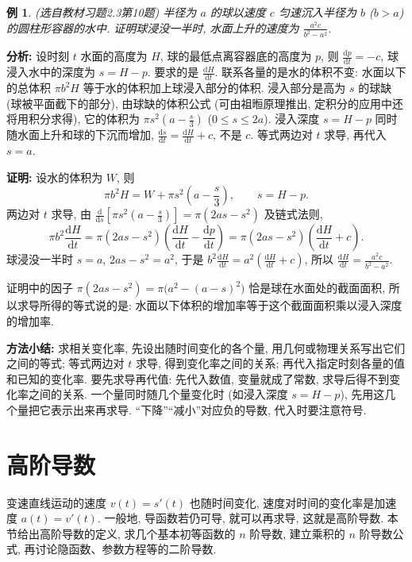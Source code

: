 \documentclass[UTF8,openany]{ctexbook}
\theoremstyle{chinesetextbook}
\newtheorem{example}{例}[section]
\newenvironment{cnproof}{\par\indent\textbf{证明:} \ignorespaces}{\par}
\newcommand{\dd}{\mathrm d}
\begin{document}
\begin{example}\label{ex:c2-h3-10}
\textnormal{(选自教材习题2.3第10题)} 半径为 $a$ 的球以速度 $c$ 匀速沉入半径为 $b$ ($b>a$) 的圆柱形容器的水中. 证明球浸没一半时, 水面上升的速度为 $\displaystyle\frac{a^2c}{b^2-a^2}$.
\end{example}
\par\indent\textbf{分析:} 设时刻 $t$ 水面的高度为 $H$, 球的最低点离容器底的高度为 $p$, 则 $\displaystyle\frac{\dd p}{\dd t}=-c$, 球浸入水中的深度为 $s=H-p$. 要求的是 $\displaystyle\frac{\dd H}{\dd t}$. 联系各量的是水的体积不变: 水面以下的总体积 $\pi b^2H$ 等于水的体积加上球浸入部分的体积. 浸入部分是高为 $s$ 的球缺 (球被平面截下的部分), 由球缺的体积公式 (可由祖暅原理推出, 定积分的应用中还将用积分求得), 它的体积为 $\displaystyle\pi s^2\left(a-\frac s3\right)$ ($0\le s\le2a$). 浸入深度 $s=H-p$ 同时随水面上升和球的下沉而增加, $\displaystyle\frac{\dd s}{\dd t}=\frac{\dd H}{\dd t}+c$, 不是 $c$. 等式两边对 $t$ 求导, 再代入 $s=a$.
\begin{cnproof}
设水的体积为 $W$, 则
\[
\pi b^2H=W+\pi s^2\left(a-\frac s3\right),\qquad s=H-p.
\]
两边对 $t$ 求导, 由 $\displaystyle\frac{\dd}{\dd s}\left[\pi s^2\left(a-\frac s3\right)\right]=\pi(2as-s^2)$ 及链式法则,
\[
\pi b^2\frac{\dd H}{\dd t}=\pi(2as-s^2)\left(\frac{\dd H}{\dd t}-\frac{\dd p}{\dd t}\right)=\pi(2as-s^2)\left(\frac{\dd H}{\dd t}+c\right).
\]
球浸没一半时 $s=a$, $2as-s^2=a^2$, 于是 $\displaystyle b^2\frac{\dd H}{\dd t}=a^2\left(\frac{\dd H}{\dd t}+c\right)$, 所以 $\displaystyle\frac{\dd H}{\dd t}=\frac{a^2c}{b^2-a^2}$.
\end{cnproof}
证明中的因子 $\pi(2as-s^2)=\pi\bigl(a^2-(a-s)^2\bigr)$ 恰是球在水面处的截面面积, 所以求导所得的等式说的是: 水面以下体积的增加率等于这个截面面积乘以浸入深度的增加率.
\par\indent\textbf{方法小结:} 求相关变化率, 先设出随时间变化的各个量, 用几何或物理关系写出它们之间的等式; 等式两边对 $t$ 求导, 得到变化率之间的关系; 再代入指定时刻各量的值和已知的变化率. 要先求导再代值: 先代入数值, 变量就成了常数, 求导后得不到变化率之间的关系. 一个量同时随几个量变化时 (如浸入深度 $s=H-p$), 先用这几个量把它表示出来再求导. “下降”“减小”对应负的导数, 代入时要注意符号.
\section{高阶导数}
变速直线运动的速度 $v(t)=s'(t)$ 也随时间变化, 速度对时间的变化率是加速度 $a(t)=v'(t)$. 一般地, 导函数若仍可导, 就可以再求导, 这就是高阶导数. 本节给出高阶导数的定义, 求几个基本初等函数的 $n$ 阶导数, 建立乘积的 $n$ 阶导数公式, 再讨论隐函数、参数方程等的二阶导数.
\end{document}
